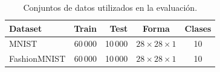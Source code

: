 \begin{table}[H]\centering
\caption{Conjuntos de datos utilizados en la evaluaci\'on.}\label{tab:datasets}
\footnotesize
\begin{tabular}{lrrcc}\toprule
Dataset & Train & Test & Forma & Clases\\\midrule
MNIST & 60\,000 & 10\,000 & $28\times28\times1$ & 10\\
FashionMNIST & 60\,000 & 10\,000 & $28\times28\times1$ & 10\\
\bottomrule\end{tabular}
\end{table}
